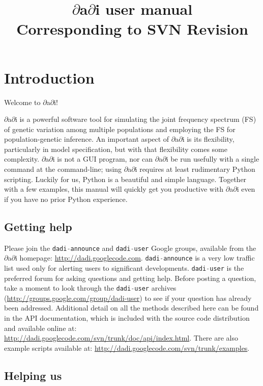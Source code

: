 \documentclass[12pt]{article}
\makeatletter
\newcommand{\dadi}{$\partial$a$\partial$i\xspace}
\newcommand{\py}[1]{\lstinline[language=Python, showstringspaces=False]@#1@}
\makeatother
\begin{document}
\title{\dadi user manual\\\normalsize  Corresponding to SVN $ $Revision$ $}
\date{}
\maketitle

\tableofcontents

\clearpage

\section{Introduction}

Welcome to \dadi!

\dadi is a powerful software tool for simulating the joint frequency spectrum (FS) of genetic variation among multiple populations and employing the FS for population-genetic inference.
An important aspect of \dadi is its flexibility, particularly in model specification, but with that flexibility comes some complexity.
\dadi is not a GUI program, nor can \dadi be run usefully with a single command at the command-line; using \dadi requires at least rudimentary Python scripting.
Luckily for us, Python is a beautiful and simple language.
Together with a few examples, this manual will quickly get you productive with \dadi even if you have no prior Python experience.

\subsection{Getting help}

Please join the \py{dadi-announce} and \py{dadi-user} Google groups, available from the \dadi homepage: \url{http://dadi.googlecode.com}.
\py{dadi-announce} is a very low traffic list used only for alerting users to significant developments.
\py{dadi-user} is the preferred forum for asking questions and getting help.
Before posting a question, take a moment to look through the \py{dadi-user} archives (\url{http://groups.google.com/group/dadi-user}) to see if your question has already been addressed.
Additional detail on all the methods described here can be found in the API documentation, which is included with the source code distribution and available online at: \url{http://dadi.googlecode.com/svn/trunk/doc/api/index.html}.
There are also example scripts available at: \url{http://dadi.googlecode.com/svn/trunk/examples}.

\subsection{Helping us}
\end{document}
